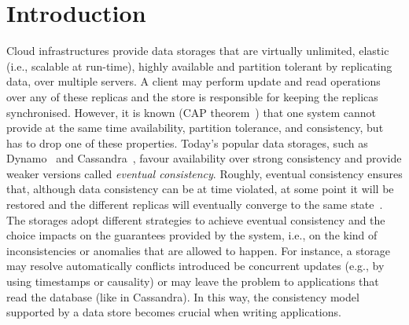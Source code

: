 
\section{Introduction}

Cloud infrastructures provide data storages that are virtually unlimited, elastic (i.e., scalable at run-time), 
highly available and partition tolerant by 
replicating data, over multiple servers. A client may  perform update and 
read operations over any of these replicas and the  store is responsible for keeping 
the  replicas synchronised. 
However, it is known (CAP theorem~\cite{CAP}) that one system cannot provide at the same time availability, 
partition tolerance, and consistency, but has to drop one of these properties. Today's popular 
data storages, such as Dynamo~\cite{DeCandia:2007:DAH:1294261.1294281} and  Cassandra~\cite{lakshman2010cassandra}, favour 
availability over strong consistency and provide weaker versions called \emph{eventual consistency}.
Roughly, eventual consistency ensures that, although data consistency can be at time violated, at some point it will be restored
and the different replicas will eventually converge to the same state~\cite{DBLP:journals/cacm/BailisG13}.
The  storages adopt different strategies to achieve eventual consistency and the choice  
impacts on the  guarantees provided by the system, i.e., on the kind of 
inconsistencies or anomalies that are allowed to happen. For instance, a storage may
resolve automatically conflicts introduced be concurrent updates (e.g., by using timestamps or causality) or  
may leave the problem to applications that read the database (like in Cassandra).
In this way, the consistency model supported by a data store becomes crucial when writing applications. 


